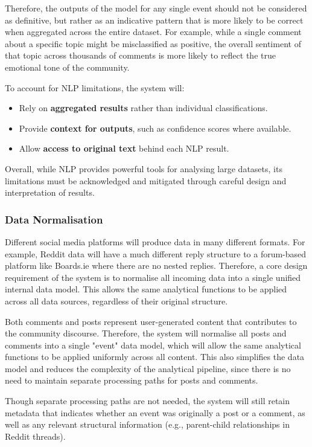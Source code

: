 \documentclass[12pt, a4paper]{article}
\begin{document}
Therefore, the outputs of the model for any single event should not be considered as definitive, but rather as an indicative pattern that is more likely to be correct when aggregated across the entire dataset. For example, while a single comment about a specific topic might be misclassified as positive, the overall sentiment of that topic across thousands of comments is more likely to reflect the true emotional tone of the community.

To account for NLP limitations, the system will:
\begin{itemize}
    \item Rely on \textbf{aggregated results} rather than individual classifications.
    \item Provide \textbf{context for outputs}, such as confidence scores where available.
    \item Allow \textbf{access to original text} behind each NLP result.
\end{itemize}

Overall, while NLP provides powerful tools for analysing large datasets, its limitations must be acknowledged and mitigated through careful design and interpretation of results.

\subsubsection{Data Normalisation}
Different social media platforms will produce data in many different formats. For example, Reddit data will have a much different reply structure to a forum-based platform like Boards.ie where there are no nested replies. Therefore, a core design requirement of the system is to normalise all incoming data into a single unified internal data model. This allows the same analytical functions to be applied across all data sources, regardless of their original structure.

Both comments and posts represent user-generated content that contributes to the community discourse. Therefore, the system will normalise all posts and comments into a single "event" data model, which will allow the same analytical functions to be applied uniformly across all content. This also simplifies the data model and reduces the complexity of the analytical pipeline, since there is no need to maintain separate processing paths for posts and comments.

Though separate processing paths are not needed, the system will still retain metadata that indicates whether an event was originally a post or a comment, as well as any relevant structural information (e.g., parent-child relationships in Reddit threads).
\end{document}
